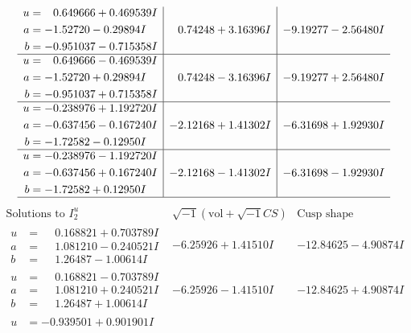 \documentclass[1p]{elsarticle_modified}
\theoremstyle{definition}
\newcommand{\I}{\sqrt{-1}}
\begin{document}
$$\begin{array}{c|c|c}
\begin{aligned}
u &= \phantom{-}0.649666 + 0.469539 I \\
a &= -1.52720 - 0.29894 I \\
b &= -0.951037 - 0.715358 I\end{aligned}
 & \phantom{-}0.74248 + 3.16396 I & -9.19277 - 2.56480 I \\ \hline\begin{aligned}
u &= \phantom{-}0.649666 - 0.469539 I \\
a &= -1.52720 + 0.29894 I \\
b &= -0.951037 + 0.715358 I\end{aligned}
 & \phantom{-}0.74248 - 3.16396 I & -9.19277 + 2.56480 I \\ \hline\begin{aligned}
u &= -0.238976 + 1.192720 I \\
a &= -0.637456 - 0.167240 I \\
b &= -1.72582 - 0.12950 I\end{aligned}
 & -2.12168 + 1.41302 I & -6.31698 + 1.92930 I \\ \hline\begin{aligned}
u &= -0.238976 - 1.192720 I \\
a &= -0.637456 + 0.167240 I \\
b &= -1.72582 + 0.12950 I\end{aligned}
 & -2.12168 - 1.41302 I & -6.31698 - 1.92930 I\\
 \hline 
 \end{array}$$\newpage$$\begin{array}{c|c|c}  
\text{Solutions to }I^u_{2}& \I (\text{vol} + \sqrt{-1}CS) & \text{Cusp shape}\\
 \hline 
\begin{aligned}
u &= \phantom{-}0.168821 + 0.703789 I \\
a &= \phantom{-}1.081210 - 0.240521 I \\
b &= \phantom{-}1.26487 - 1.00614 I\end{aligned}
 & -6.25926 + 1.41510 I & -12.84625 - 4.90874 I \\ \hline\begin{aligned}
u &= \phantom{-}0.168821 - 0.703789 I \\
a &= \phantom{-}1.081210 + 0.240521 I \\
b &= \phantom{-}1.26487 + 1.00614 I\end{aligned}
 & -6.25926 - 1.41510 I & -12.84625 + 4.90874 I \\ \hline\begin{aligned}
u &= -0.939501 + 0.901901 I \\

\end{aligned}
\end{array}$$
\end{document}
